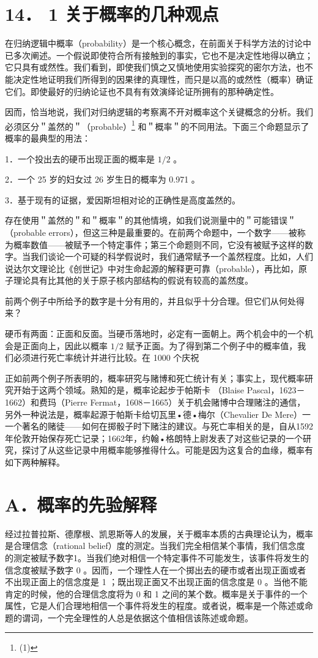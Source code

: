 \section*{14． 1 关于概率的几种观点}
在归纳逻辑中概率（probability）是一个核心概念，在前面关于科学方法的讨论中已多次阐述。一个假说即使符合所有接触到的事实，它也不是决定性地得以确立；它只具有或然性。我们看到，即使我们慎之又慎地使用实验探究的密尔方法，也不能决定性地证明我们所得到的因果律的真理性，而只是以高的或然性（概率）确证它们。即使最好的归纳论证也不具有有效演绎论证所拥有的那种确定性。

因而，恰当地说，我们对归纳逻辑的考察离不开对概率这个关键概念的分析。我们必须区分＂盖然的＂（probable）\footnote{(1)} 和＂概率＂的不同用法。下面三个命题显示了概率的最典型的用法：

1．一个投出去的硬币出现正面的概率是 $1 / 2$ 。

2．一个 25 岁的妇女过 26 岁生日的概率为 0.971 。

3．基于现有的证据，爱因斯坦相对论的正确性是高度盖然的。

存在使用＂盖然的＂和＂概率＂的其他情境，如我们说测量中的＂可能错误＂（probable errors），但这三种是最重要的。在前两个命题中，一个数字——被称为概率数值——被赋予一个特定事件；第三个命题则不同，它没有被赋予这样的数字。当我们谈论一个可疑的科学假说时，我们通常赋予一个盖然程度。比如，人们说达尔文理论比《创世记》中对生命起源的解释更可靠（probable），再比如，原子理论具有比其他的关于原子核内部结构的假说有较高的盖然度。

前两个例子中所给予的数字是十分有用的，并且似乎十分合理。但它们从何处得来？

硬币有两面：正面和反面。当硬币落地时，必定有一面朝上。两个机会中的一个机会是正面向上，因此以概率 $1 / 2$ 赋予正面。为了得到第二个例子中的概率值，我们必须进行死亡率统计并进行比较。在 1000 个庆祝

正如前两个例子所表明的，概率研究与赌博和死亡统计有关；事实上，现代概率研究开始于这两个领域。熟知的是，概率论起步于帕斯卡 （Blaise Pascal，1623－1662）和费玛（Pierre Fermat，1608－1665）关于机会赌博中合理赌注的通信，另外一种说法是，概率起源于帕斯卡给切瓦里•德•梅尔（Chevalier De Mere）一一个著名的赌徒——如何在掷骰子时下赌注的建议。与死亡率相关的是，自从1592年伦敦开始保存死亡记录；1662年，约翰•格朗特上尉发表了对这些记录的一个研究，探讨了从这些记录中用概率能够推得什么。可能是因为这复合的血缘，概率有如下两种解释。

\section*{A．概率的先验解释}
经过拉普拉斯、德摩根、凯恩斯等人的发展，关于概率本质的古典理论认为，概率是合理信念（rational belief）度的测定。当我们完全相信某个事情，我们信念度的测定被赋予数字1。当我们绝对相信一个特定事件不可能发生，该事件将发生的信念度被赋予数字 0 。因而，一个理性人在一个掷出去的硬市或者出现正面或者不出现正面上的信念度是 1 ；既出现正面又不出现正面的信念度是 0 。当他不能肯定的时候，他的合理信念度将为 0 和 1 之间的某个数。概率是关于事件的一个属性，它是人们合理地相信一个事件将发生的程度。或者说，概率是一个陈述或命题的谓词，一个完全理性的人总是依据这个值相信该陈述或命题。

